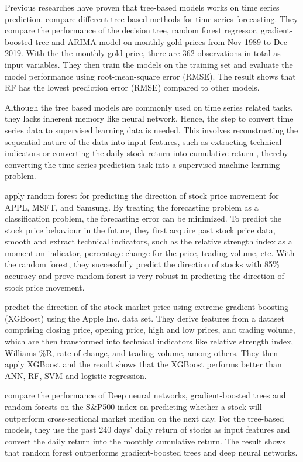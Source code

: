 \documentclass{article}
\begin{document}
Previous researches have proven that tree-based models works on time series prediction. \cite{rady2021time} compare different tree-based methods for time series forecasting. They compare the performance of the decision tree, random forest regressor, gradient-boosted tree and ARIMA model on monthly gold prices from Nov 1989 to Dec 2019. With the the monthly gold price, there are 362 observations in total as input variables. They then train the models on the training set and evaluate the model performance using root-mean-square error (RMSE). The result shows that RF has the lowest prediction error (RMSE) compared to other models.

Although the tree based models are commonly used on time series related tasks, they lacks inherent memory like neural network. Hence, the step to convert time series data to supervised learning data is needed. This involves reconstructing the sequential nature of the data into input features, such as extracting technical indicators \citep{khaidem2016predicting, dey2016forecasting} or converting the daily stock return into cumulative return \citep{krauss2017deep}, thereby converting the time series prediction task into a supervised machine learning problem. 

\cite{khaidem2016predicting} apply random forest for predicting the direction of stock price movement for APPL, MSFT, and Samsung. By treating the forecasting problem as a classification problem, the forecasting error can be minimized. To predict the stock price behaviour in the future, they first acquire past stock price data, smooth and extract technical indicators, such as the relative strength index as a momentum indicator, percentage change for the price, trading volume, etc. With the random forest, they successfully predict the direction of stocks with 85\% accuracy and prove random forest is very robust in predicting the direction of stock price movement.

\cite{dey2016forecasting} predict the direction of the stock market price using extreme gradient boosting (XGBoost) using the Apple Inc. data set. They derive features from a dataset comprising closing price, opening price, high and low prices, and trading volume, which are then transformed into technical indicators like relative strength index, Williams \%R, rate of change, and trading volume, among others. They then apply XGBoost and the result shows that the XGBoost performs better than ANN, RF, SVM and logistic regression. 

\cite{krauss2017deep} compare the performance of Deep neural networks, gradient-boosted trees and random forests on the S\&P500 index on predicting whether a stock will outperform cross-sectional market median on the next day. For the tree-based models, they use the past 240 days' daily return of stocks as input features and convert the daily return into the monthly cumulative return. The result shows that random forest outperforms gradient-boosted trees and deep neural networks. 
\end{document}
